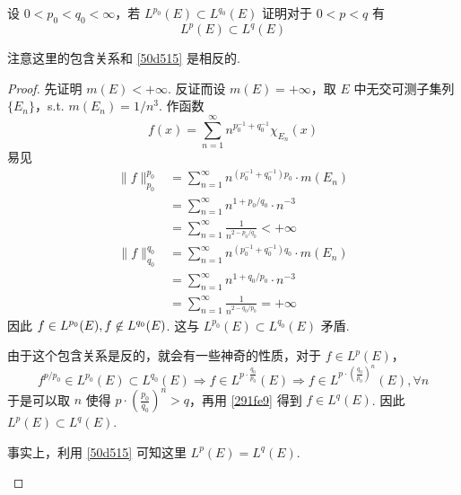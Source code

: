 \begin{exercise}[$L^{p},L^{q}$ 空间的包含关系]
设 $0<p_0<q_0<\infty$，若 $L^{p_0}(E)\subset L^{q_0}(E)$ 证明对于 $0<p<q$ 有
\[
L^{p}(E)\subset L^{q}(E)
\]
\end{exercise}
\begin{note}
注意这里的包含关系和 \cref{50d515} 是相反的.
\end{note}
\begin{proof}
先证明 $m(E)<+\infty$. 反证而设 $m(E)=+\infty$，取 $E$ 中无交可测子集列 $\{ E_n \}$，s.t. $m(E_n)=1/n^3$. 作函数
\[
f(x)=\sum_{n=1}^{\infty} n^{p_0 ^{-1}+q_0 ^{-1}}\chi_{E_n}(x)
\]
易见
\[
\begin{aligned}
\lVert f \rVert ^{p_0}_{p_0} & =\sum_{n=1}^{\infty} n^{(p_0 ^{-1}+q_0 ^{-1})p_0}\cdot m(E_n) \\
 & =\sum_{n=1}^{\infty} n^{1+p_0/q_0}\cdot n^{-3} \\
 & =\sum_{n=1}^{\infty} \frac{1}{n^{2-p_0/q_0}}<+\infty 
\end{aligned}
\]
\[
\begin{aligned}
\lVert f \rVert ^{q_0}_{q_0} & =\sum_{n=1}^{\infty} n^{(p_0 ^{-1}+q_0 ^{-1})q_0}\cdot m(E_n) \\
 & =\sum_{n=1}^{\infty} n^{1+q_0/p_0 }\cdot n^{-3} \\
 & =\sum_{n=1}^{\infty} \frac{1}{n^{2-q_0/p_0}} =+\infty
\end{aligned}
\]
因此 $f\in L^{p_0}(E),f\centernot{\in}L^{q_0}(E)$. 这与 $L^{p_0}(E)\subset L^{q_0}(E)$ 矛盾.

由于这个包含关系是反的，就会有一些神奇的性质，对于 $f\in L^{p}(E)$，
\[
f^{p/p_0}\in L^{p_0}(E)\subset L^{q_0}(E)\Rightarrow f\in L^{p\cdot\frac{q_0}{p_0}}(E)\Rightarrow f\in L^{p\cdot\left( \frac{q_0}{p_0} \right)^{n}}(E),\forall n
\]
于是可以取 $n$ 使得 $p\cdot\left( \frac{p_0}{q_0} \right)^{n}>q$，再用 \cref{291fe9}  得到 $f\in L^{q}(E)$. 因此 $L^{p}(E)\subset L^{q}(E)$.

\begin{note}
事实上，利用 \cref{50d515} 可知这里 $L^{p}(E)=L^{q}(E)$.
\end{note}
\end{proof}

